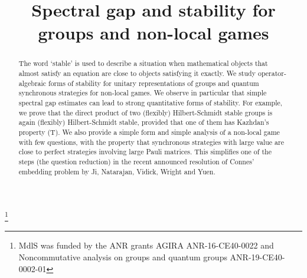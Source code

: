 \documentclass[JEP,XML,SOM,Unicode,published]{cedram}
\theoremstyle{plain}
\theoremstyle{definition}
\begin{document}
\frontmatter
\title{Spectral gap and stability for groups and non-local games}

\author[\initial{M.} \lastname{De La Salle}]{ }
\address{Institut Camille Jordan, Université de Lyon, CNRS,\\
43 boulevard du 11 novembre 1918, F-69622 Villeurbanne Cedex, France}

\thanks{MdlS was funded by the ANR grants AGIRA ANR-16-CE40-0022 and Noncommutative analysis on groups and quantum groups ANR-19-CE40-0002-01}

\begin{abstract}
The word `stable' is used to describe a situation when mathematical objects that almost satisfy an equation are close to objects satisfying it exactly. We study operator-algebraic forms of stability for unitary representations of groups and quantum synchronous strategies for non-local games. We observe in particular that simple spectral gap estimates can lead to strong quantitative forms of stability. For example, we prove that the direct product of two (flexibly) Hilbert-Schmidt stable groups is again (flexibly) Hilbert-Schmidt stable, provided that one of them has Kazhdan's property (T). We also provide a simple form and simple analysis of a non-local game with few questions, with the property that synchronous strategies with large value are close to perfect strategies involving large Pauli matrices. This simplifies one of the steps (the question reduction) in the recent announced resolution of Connes' embedding problem by Ji, Natarajan, Vidick, Wright and Yuen.
\end{abstract}




\end{document}
